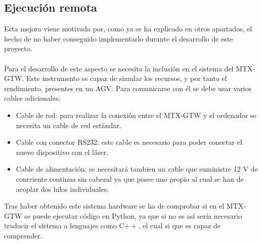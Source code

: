 \subsection{Ejecución remota}
Esta mejora viene motivada por, como ya se ha explicado en otros apartados, el hecho de no haber conseguido implementarlo durante el desarrollo de este proyecto.\\
\\
Para el desarrollo de este aspecto se necesita la inclusión en el sistema del MTX-GTW. Este instrumento es capaz de simular los recursos, y por tanto el rendimiento, presentes en un AGV. Para comunicarse con él se debe usar varios cables adicionales:
\begin{itemize}
	\item Cable de red: para realizar la conexión entre el MTX-GTW y el ordenador se necesita un cable de red estándar.
	\item Cable con conector RS232: este cable es necesario para poder conectar el nuevo dispositivo con el láser.
	\item Cable de alimentación: se necesitará tambien un cable que suministre 12 V de conrriente continua sin cabezal ya que posee uno propio al cual se han de acoplar dos hilos individuales.
\end{itemize}
Tras haber obtenido este sistema hardware se ha de comprobar si en el MTX-GTW se puede ejecutar código en Python, ya que si no es así sería necesario traducir el sistema a lenguajes como C$++$, el cual si que es capaz de comprender.